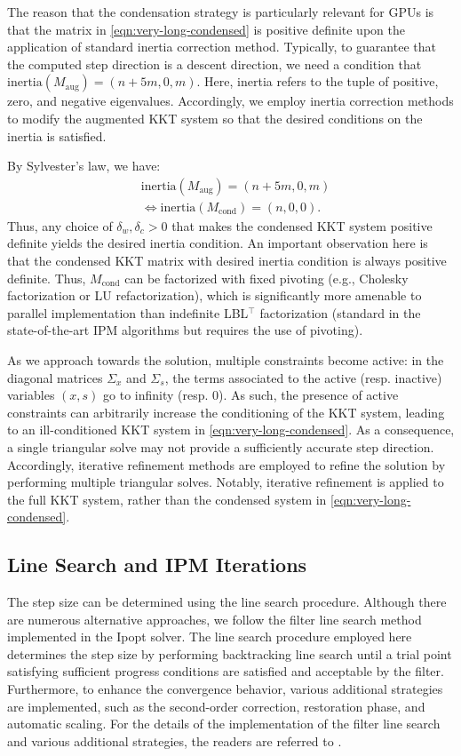 The reason that the condensation strategy is particularly relevant for
GPUs is that the matrix in \eqref{eqn:very-long-condensed} is positive
definite upon the application of standard inertia correction
method. Typically, to guarantee that the computed step direction is a
descent direction, we need a condition that
$\text{inertia}(M_\text{aug}) = (n+5m,0,m)$. Here, inertia refers to
the tuple of positive, zero, and negative eigenvalues. Accordingly, we
employ inertia correction methods to modify the augmented KKT system
so that the desired conditions on the inertia is satisfied.

By Sylvester's law, we have:
\begin{align*}
  &\text{inertia}(M_\text{aug}) = (n+5m,0,m)\\
  &\iff \text{inertia}(M_\text{cond}) = (n,0,0).
\end{align*}
Thus, any choice of $\delta_w,\delta_c>0$ that makes the condensed KKT
system positive definite yields the desired inertia condition.
An important observation here is that the condensed KKT matrix
with desired inertia condition is always positive definite.
Thus, $M_{\text{cond}}$ can be factorized with fixed pivoting (e.g.,
Cholesky factorization or LU refactorization), which is significantly
more amenable to parallel implementation than indefinite LBL$^\top$
factorization (standard in the state-of-the-art IPM
algorithms but requires the use of pivoting).

As we approach towards the solution, multiple constraints become active:
in the diagonal matrices $\Sigma_x$ and $\Sigma_s$, the terms associated
to the active (resp. inactive) variables $(x, s)$ go to infinity
(resp. $0$).
As such, the presence of active constraints can arbitrarily
increase the conditioning of the KKT system, leading to
an ill-conditioned KKT system in \eqref{eqn:very-long-condensed}.
As a consequence, a single triangular solve may not provide a
sufficiently accurate step direction. Accordingly, iterative
refinement methods are employed to refine the solution by performing
multiple triangular solves. Notably, iterative refinement is applied
to the full KKT system, rather than the condensed system in
\eqref{eqn:very-long-condensed}.

\subsection{Line Search and IPM Iterations}

The step size can be determined using the line search procedure.
Although there are numerous alternative approaches, we follow the
filter line search method implemented in the Ipopt solver. The line
search procedure employed here determines the step size by performing
backtracking line search until a trial point satisfying sufficient
progress conditions are satisfied and acceptable by the
filter. Furthermore, to enhance the convergence behavior, various
additional strategies are implemented, such as the second-order
correction, restoration phase, and automatic scaling. For the details
of the implementation of the filter line search and various additional
strategies, the readers are referred to
\cite{wachter2006implementation}.

